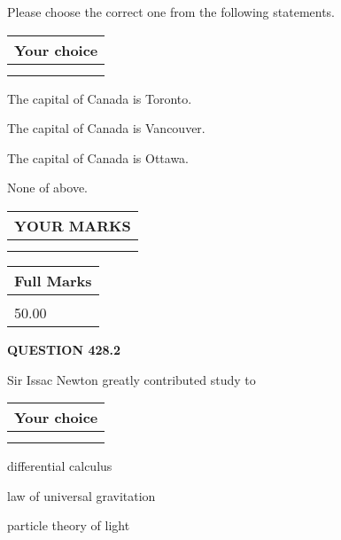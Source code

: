 \documentclass[12pt]{article}
\begin{document}
  
Please choose the correct one from the following statements.
  
  
\noindent\hspace{3.0in} \begin{tabular}{|l|}
\hline
Your choice \\
\hline
 \\ 
 \\ 
\hline
\end{tabular}
  
  
 
 
The capital of Canada is Toronto.
 
 
The capital of Canada is Vancouver.
 
 
The capital of Canada is Ottawa.
 
 
 None of above.
 
 
  
\vspace{0.2in}
  
\noindent\begin{tabular}{|l|}
\hline
 YOUR MARKS  \\
\hline
 \\ 
 \\ 
\hline
\end{tabular}
\hspace{0.05in} \begin{tabular}{|l|}
\hline
 Full Marks  \\
\hline
 \\ 
50.00 \\
\hline
\end{tabular}
{\textbf{\Large{QUESTION
428.2 
}}}
  
  
Sir Issac Newton greatly contributed study to
  
  
\noindent\hspace{3.0in} \begin{tabular}{|l|}
\hline
Your choice \\
\hline
 \\ 
 \\ 
\hline
\end{tabular}
  
  
 
 
differential calculus
 
 
law of universal gravitation
 
 
particle theory of light
 
\end{document}
